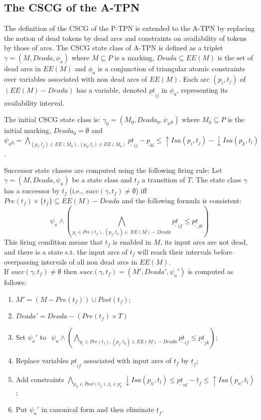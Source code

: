 \documentclass[submission,copyright,creativecommons]{eptcs}
\numberwithin{equation}{section}
\begin{document}
\subsection{The CSCG of the A-TPN}
The definition of the CSCG of the P-TPN is extended to the A-TPN by replacing the notion of dead tokens by dead arcs and constraints on availability of tokens by those of arcs. The CSCG state class of A-TPN is defined as a triplet $\gamma=(M, Deada, \phi_a)$ where $M \subseteq P$ is a marking, $Deada \subseteq EE(M)$ is the set of dead arcs in $EE(M)$ and $\phi_a$ is a conjunction of triangular atomic constraints over variables associated with non dead arcs of $EE(M)$. Each arc $(p_i,t_j)$ of
\((EE(M)-Deada)\) has a variable, denoted $\underline{pt}_{ij}$ in \(\phi_a\), representing
its availability interval.
\par \indent The initial CSCG state class is: \(\gamma_0=(M_{0},Deada_0, \psi_a{_0})\) where $M_0 \subseteq P$ is the initial marking, $Deada_0=\emptyset$ and $\psi_a{_0} = \underset{ (p_i,t_j) \in EE(M_0), (p_k,t_l) \in EE(M_0)} \bigwedge \underline{pt}_{ij} - \underline{p}_{kl} \leq
{\uparrow Isa(p_i,t_j)}-{\downarrow Isa(p_k,t_l)} $.
\par Successor state classes are computed using the following firing rule:
Let \(\gamma=(M, Deada,\psi_a)\) be a state class and \(t_f\) a transition of $T$. The state
class \(\gamma\) has a successor by \(t_f\) (i.e.,
\(succ(\gamma, t_f)\neq \emptyset\)) iff
 \(Pre(t_f)\times \{t_f\} \subseteq EE(M)-Deada\) and the following formula is
 consistent: $$ \psi_a \wedge (\underset{p_i \in Pre(t_f), (p_j,t_k) \in \ EE(M)-Deada}\bigwedge \underline{pt}_{if} \leq  \underline{pt}_{jk})$$
This firing condition means that $t_f$ is enabled in $M$, its input arcs are not dead, and there is a state s.t. the input arcs  of $t_f$ will reach their intervals before overpassing intervals of all non dead arcs in $EE(M)$. \\
If \(succ(\gamma, t_f)\neq \emptyset\) then \(succ(\gamma,
 t_f)=(M',Deada',\psi_a')\) is  computed as follows:\begin{enumerate} \item \(M' = (M - Pre(t_f)) \cup
 Post(t_f)\);
 \item $Deada'=Deada - (Pre(t_f) \times T)$
 \item Set $\psi_a'$ to $ \ \ \psi_a \wedge (\underset{p_i \in Pre(t_f), (p_j,t_k) \in EE(M)-Deada}\bigwedge \underline{pt}_{if} \leq  \underline{pt}_{jk})$;\item Replace variables $\underline{pt}_{if}$ associated with input arcs of $t_f$ by $\underline{t}_f$; \item Add constraints $\underset{p_n \in Post(t_f), t_l \in p_{n}^\circ} \bigwedge {\downarrow Isa(p_n,t_l)} \leq \underline{pt}_{nl} - \underline{t}_f \leq {\uparrow Isa(p_n,t_l)}$;
\item Put $\psi_a'$ in canonical form and then eliminate  $\underline{t}_f$.
\end{enumerate}
\end{document}
